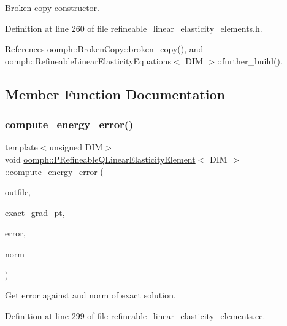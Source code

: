 Broken copy constructor. 



Definition at line 260 of file refineable\+\_\+linear\+\_\+elasticity\+\_\+elements.\+h.



References oomph\+::\+Broken\+Copy\+::broken\+\_\+copy(), and oomph\+::\+Refineable\+Linear\+Elasticity\+Equations$<$ D\+I\+M $>$\+::further\+\_\+build().



\subsection{Member Function Documentation}
\mbox{\label{classoomph_1_1PRefineableQLinearElasticityElement_a2c7c5d71fb2bf00b32420545ac31df68}} 
\subsubsection{\texorpdfstring{compute\+\_\+energy\+\_\+error()}{compute\_energy\_error()}}
{\footnotesize\ttfamily template$<$unsigned D\+IM$>$ \\
void \hyperlink{classoomph_1_1PRefineableQLinearElasticityElement}{oomph\+::\+P\+Refineable\+Q\+Linear\+Elasticity\+Element}$<$ D\+IM $>$\+::compute\+\_\+energy\+\_\+error (\begin{DoxyParamCaption}\item[{std\+::ostream \&}]{outfile,  }\item[{\hyperlink{classoomph_1_1FiniteElement_a690fd33af26cc3e84f39bba6d5a85202}{Finite\+Element\+::\+Steady\+Exact\+Solution\+Fct\+Pt}}]{exact\+\_\+grad\+\_\+pt,  }\item[{double \&}]{error,  }\item[{double \&}]{norm }\end{DoxyParamCaption})}



Get error against and norm of exact solution. 



Definition at line 299 of file refineable\+\_\+linear\+\_\+elasticity\+\_\+elements.\+cc.



